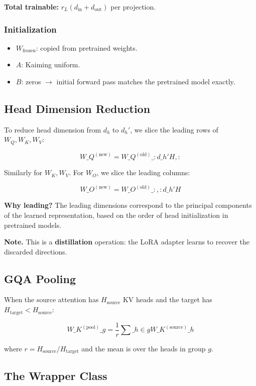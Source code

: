 \textbf{Total trainable:} $r_L (d_\text{in} + d_\text{out})$ per projection.

\subsubsection{Initialization}

\begin{itemize}
\item $W_\text{frozen}$: copied from pretrained weights.
\item $A$: Kaiming uniform.
\item $B$: zeros $\to$ initial forward pass matches the pretrained model exactly.

\end{itemize}
\subsection{Head Dimension Reduction}

To reduce head dimension from $d_h$ to $d_h'$, we slice the leading rows 
of $W_Q, W_K, W_V$:

\[
W\_Q^{(\text{new})} = {W\_Q^{(\text{old})}}\_{:d\_h' H, :}
\]

Similarly for $W_K, W_V$. For $W_O$, we slice the leading columns:

\[
W\_O^{(\text{new})} = {W\_O^{(\text{old})}}\_{:, :d\_h' H}
\]

\textbf{Why leading?} The leading dimensions correspond to the principal 
components of the learned representation, based on the order of head 
initialization in pretrained models.

\textbf{Note.} This is a \textbf{distillation} operation: the LoRA adapter learns to 
recover the discarded directions.

\subsection{GQA Pooling}

When the source attention has $H_\text{source}$ KV heads and the target has 
$H_\text{target} < H_\text{source}$:

\[
{W\_K^{(\text{pool})}}\_g = \frac{1}{r} \sum\_{h \in g} {W\_K^{(\text{source})}}\_h
\]

where $r = H_\text{source} / H_\text{target}$ and the mean is over the 
heads in group $g$.

\subsection{The Wrapper Class}

